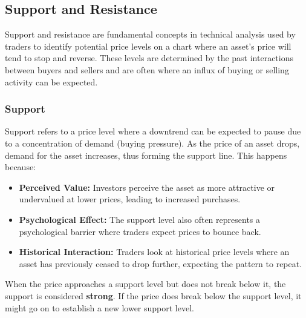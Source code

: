 \documentclass{report}
\begin{document}
    \pagebreak 
    \subsection{Support and Resistance}
    \bigbreak \noindent 
    Support and resistance are fundamental concepts in technical analysis used by traders to identify potential price levels on a chart where an asset's price will tend to stop and reverse. These levels are determined by the past interactions between buyers and sellers and are often where an influx of buying or selling activity can be expected.
    \bigbreak \noindent 
    \subsubsection{Support}
    \bigbreak \noindent 
    Support refers to a price level where a downtrend can be expected to pause due to a concentration of demand (buying pressure). As the price of an asset drops, demand for the asset increases, thus forming the support line. This happens because:
    \begin{itemize}
        \item \textbf{Perceived Value:} Investors perceive the asset as more attractive or undervalued at lower prices, leading to increased purchases.
        \item \textbf{Psychological Effect:} The support level also often represents a psychological barrier where traders expect prices to bounce back.
        \item \textbf{Historical Interaction:} Traders look at historical price levels where an asset has previously ceased to drop further, expecting the pattern to repeat.
    \end{itemize}
    \bigbreak \noindent 
    When the price approaches a support level but does not break below it, the support is considered \textbf{strong}. If the price does break below the support level, it might go on to establish a new lower support level.

    \bigbreak \noindent 
\end{document}
